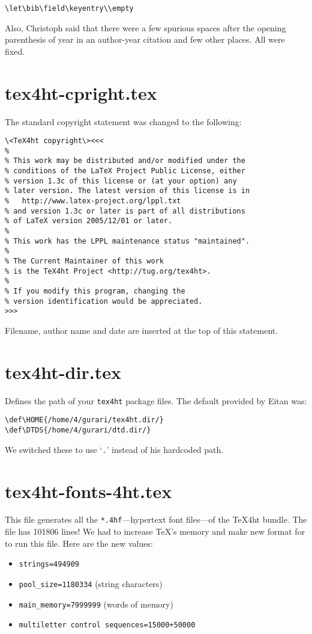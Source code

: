 \begin{verbatim}
\let\bib\field\keyentry\\empty
\end{verbatim}

Also, Christoph said that there were a few spurious spaces after the
opening parenthesis of year in an author-year citation and few other
places.  All were fixed.


\section{tex4ht-cpright.tex}

The standard copyright statement was changed to the following:

\begin{verbatim}
\<TeX4ht copyright\><<<
%
% This work may be distributed and/or modified under the
% conditions of the LaTeX Project Public License, either
% version 1.3c of this license or (at your option) any
% later version. The latest version of this license is in
%   http://www.latex-project.org/lppl.txt
% and version 1.3c or later is part of all distributions
% of LaTeX version 2005/12/01 or later.
%
% This work has the LPPL maintenance status "maintained".
%
% The Current Maintainer of this work
% is the TeX4ht Project <http://tug.org/tex4ht>.
% 
% If you modify this program, changing the 
% version identification would be appreciated.
>>>
\end{verbatim}

Filename, author name and date are inserted at the top of this
statement.


\section{tex4ht-dir.tex}

Defines the path of your \Verb=tex4ht= package files.  The default
provided by Eitan was:
\begin{verbatim}
\def\HOME{/home/4/gurari/tex4ht.dir/}
\def\DTDS{/home/4/gurari/dtd.dir/}           
\end{verbatim}

We switched these to use `\texttt{.}' instead of his hardcoded path.


\section{tex4ht-fonts-4ht.tex}

This file generates all the \Verb=*.4hf=---hypertext font files---of
the \TeX{}4ht bundle.  The file has 101806 lines! We had to increase
\TeX{}'s memory and make new format for \latex to run this file. Here
are the new values:
\begin{itemize}
\item \Verb|strings=494909|
\item \Verb|pool_size=1180334| (string characters)
\item \Verb|main_memory=7999999| (words of memory)
\item \Verb|multiletter control sequences=15000+50000|
\end{itemize}

